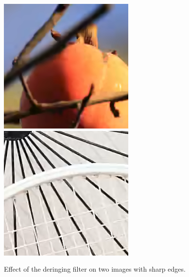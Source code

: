 \documentclass[english,conference,10pt]{IEEEtran}
\begin{document}
\begin{figure}
\begin{minipage}[t]{0.49\columnwidth}
	\end{minipage}
	\begin{minipage}[t]{0.49\columnwidth}
		\includegraphics[width=\columnwidth]{fruits_dering_crop}
		\includegraphics[width=\columnwidth]{bike_dering_crop}
	\end{minipage}
	\caption{Effect of the deringing filter on two images with sharp edges.}
	\label{fig:deringing}
\end{figure}
\end{document}
